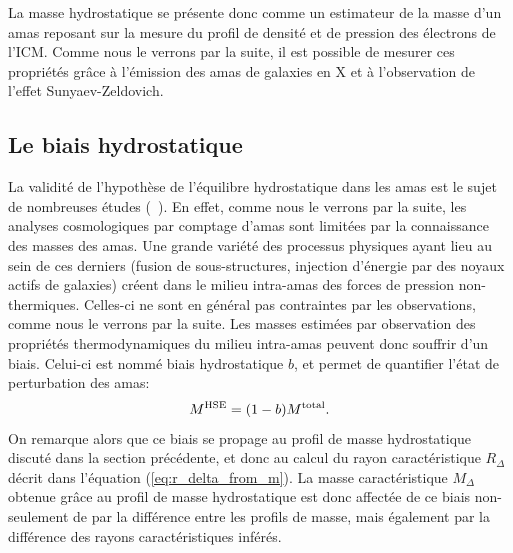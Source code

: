 La masse hydrostatique se présente donc comme un estimateur de la masse d'un amas reposant sur la mesure du profil de densité et de pression des électrons de l'ICM.
Comme nous le verrons par la suite, il est possible de mesurer ces propriétés grâce à l'émission des amas de galaxies en X et à l'observation de l'effet Sunyaev-Zeldovich.

\subsection{Le biais hydrostatique}\label{sec:hse_bias}

La validité de l'hypothèse de l'équilibre hydrostatique dans les amas est le sujet de nombreuses études (\eg\ \cite{salvati_mass_2019}).
En effet, comme nous le verrons par la suite, les analyses cosmologiques par comptage d'amas sont limitées par la connaissance des masses des amas.
Une grande variété des processus physiques ayant lieu au sein de ces derniers (fusion de sous-structures, injection d'énergie par des noyaux actifs de galaxies) créent dans le milieu intra-amas des forces de pression non-thermiques.
Celles-ci ne sont en général pas contraintes par les observations, comme nous le verrons par la suite.
Les masses estimées par observation des propriétés thermodynamiques du milieu intra-amas peuvent donc souffrir d'un biais.
Celui-ci est nommé biais hydrostatique $b$, et permet de quantifier l'état de perturbation des amas:
\begin{equation}
    \label{eq:hse_bias}
    M^{\rm HSE} = (1-b)M^{\rm total}.
\end{equation}
On remarque alors que ce biais se propage au profil de masse hydrostatique discuté dans la section précédente, et donc au calcul du rayon caractéristique $R_\Delta$ décrit dans l'équation (\ref{eq:r_delta_from_m}).
La masse caractéristique $M_\Delta$ obtenue grâce au profil de masse hydrostatique est donc affectée de ce biais non-seulement de par la différence entre les profils de masse, mais également par la différence des rayons caractéristiques inférés.

